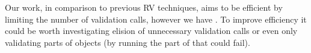 Our work, in comparison to previous RV techniques, aims to be efficient by limiting the number of validation calls, however we have .
To improve efficiency it could be worth investigating elision of unnecessary validation calls
or even only validating parts of objects (by running the part of \Q@validate@ that could fail).